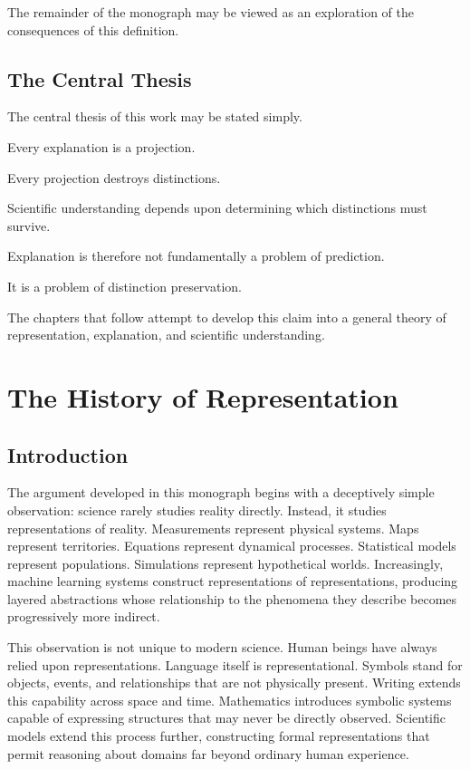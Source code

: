 \documentclass[11pt,oneside,openany]{book}
\begin{document}
The remainder of the monograph may be viewed as an exploration of the consequences of this definition.

\section{The Central Thesis}

The central thesis of this work may be stated simply.

Every explanation is a projection.

Every projection destroys distinctions.

Scientific understanding depends upon determining which distinctions must survive.

Explanation is therefore not fundamentally a problem of prediction.

It is a problem of distinction preservation.

The chapters that follow attempt to develop this claim into a general theory of representation, explanation, and scientific understanding.

\chapter{The History of Representation}

\section{Introduction}

The argument developed in this monograph begins with a deceptively simple observation: science rarely studies reality directly. Instead, it studies representations of reality. Measurements represent physical systems. Maps represent territories. Equations represent dynamical processes. Statistical models represent populations. Simulations represent hypothetical worlds. Increasingly, machine learning systems construct representations of representations, producing layered abstractions whose relationship to the phenomena they describe becomes progressively more indirect.

This observation is not unique to modern science. Human beings have always relied upon representations. Language itself is representational. Symbols stand for objects, events, and relationships that are not physically present. Writing extends this capability across space and time. Mathematics introduces symbolic systems capable of expressing structures that may never be directly observed. Scientific models extend this process further, constructing formal representations that permit reasoning about domains far beyond ordinary human experience.
\end{document}
